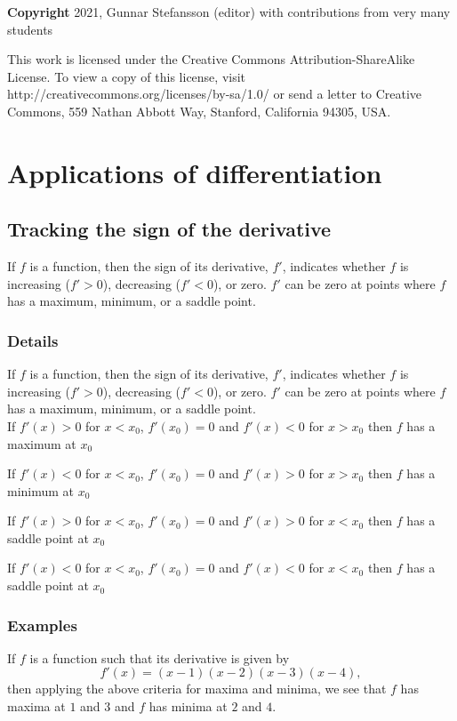 \documentclass[12pt,a4paper]{article}
\theoremstyle{regla}
\theoremstyle{remark}
\theoremstyle{definition}
\theoremstyle{nonumberbreak}
\begin{document}
{\bf Copyright}
2021, Gunnar Stefansson (editor) with contributions from very many students

This work is licensed under the Creative Commons
Attribution-ShareAlike License. To view a copy of this license, visit
http://creativecommons.org/licenses/by-sa/1.0/ or send a letter to
Creative Commons, 559 Nathan Abbott Way, Stanford, California 94305,
USA.
\clearpage
\section{Applications of differentiation}
\subsection{Tracking the sign of the derivative}
\begin{fbox}
\begin{minipage}{0.97\textwidth}
If $f$ is a function, then the sign of its derivative, $f'$, indicates whether $f$ is increasing ($f'>0$), decreasing ($f'<0$), or zero. $f'$ can be zero at points where $f$ has a maximum, minimum, or a saddle point.

\end{minipage}
\end{fbox}
\subsubsection{Details}
If $f$ is a function, then the sign of its derivative, $f'$, indicates whether $f$ is increasing ($f'>0$), decreasing ($f'<0$), or zero. $f'$ can be zero at points where $f$ has a maximum, minimum, or a saddle point.\\

If $f'(x)>0$ for $x<x_0$, $f'(x_0)=0$ and $f'(x)<0$ for $x>x_0$ then $f$ has  a maximum at $x_0$ 

If $f'(x)<0$ for $x<x_0$, $f'(x_0)=0$ and $f'(x)>0$ for $x>x_0$ then  $f$ has   a minimum at $x_0$ 

If $f'(x)>0$ for $x<x_0$, $f'(x_0)=0$ and $f'(x)>0$ for $x<x_0$ then  $f$ has   a saddle point at $x_0$ 

If $f'(x)<0$ for $x<x_0$, $f'(x_0)=0$ and $f'(x)<0$ for $x<x_0$ then  $f$ has   a saddle point at $x_0$

\subsubsection{Examples}
\begin{xmpl}
If $f$ is a function such that its derivative is given by
$$
f'(x) = (x-1)(x-2)(x-3)(x-4),$$
then applying the above criteria for maxima and minima, we see that $f$ has maxima at $1$ and $3$ and $f$ has minima at $2$ and $4$.
\end{xmpl}
\end{document}
